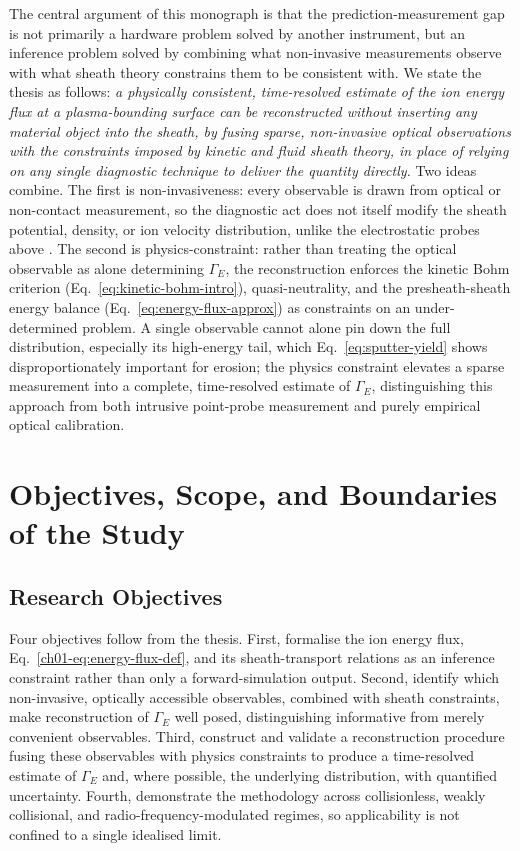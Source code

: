 The central argument of this monograph is that the prediction-measurement gap is not primarily a hardware problem solved by another instrument, but an inference problem solved by combining what non-invasive measurements observe with what sheath theory constrains them to be consistent with. We state the thesis as follows: \emph{a physically consistent, time-resolved estimate of the ion energy flux at a plasma-bounding surface can be reconstructed without inserting any material object into the sheath, by fusing sparse, non-invasive optical observations with the constraints imposed by kinetic and fluid sheath theory, in place of relying on any single diagnostic technique to deliver the quantity directly.} Two ideas combine. The first is non-invasiveness: every observable is drawn from optical or non-contact measurement, so the diagnostic act does not itself modify the sheath potential, density, or ion velocity distribution, unlike the electrostatic probes above \cite{ref0539}. The second is physics-constraint: rather than treating the optical observable as alone determining $\Gamma_E$, the reconstruction enforces the kinetic Bohm criterion (Eq.~\eqref{eq:kinetic-bohm-intro}), quasi-neutrality, and the presheath-sheath energy balance (Eq.~\eqref{eq:energy-flux-approx}) as constraints on an under-determined problem. A single observable cannot alone pin down the full distribution, especially its high-energy tail, which Eq.~\eqref{eq:sputter-yield} shows disproportionately important for erosion; the physics constraint elevates a sparse measurement into a complete, time-resolved estimate of $\Gamma_E$, distinguishing this approach from both intrusive point-probe measurement and purely empirical optical calibration.

\section{Objectives, Scope, and Boundaries of the Study}

\subsection{Research Objectives}

Four objectives follow from the thesis. First, formalise the ion energy flux, Eq.~\eqref{ch01-eq:energy-flux-def}, and its sheath-transport relations as an inference constraint rather than only a forward-simulation output. Second, identify which non-invasive, optically accessible observables, combined with sheath constraints, make reconstruction of $\Gamma_E$ well posed, distinguishing informative from merely convenient observables. Third, construct and validate a reconstruction procedure fusing these observables with physics constraints to produce a time-resolved estimate of $\Gamma_E$ and, where possible, the underlying distribution, with quantified uncertainty. Fourth, demonstrate the methodology across collisionless, weakly collisional, and radio-frequency-modulated regimes, so applicability is not confined to a single idealised limit.

